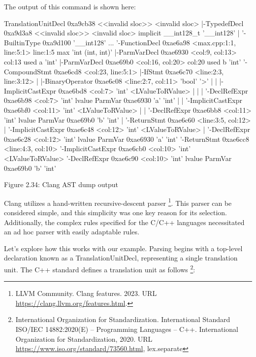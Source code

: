 The output of this command is shown here:

\begin{shell}
TranslationUnitDecl 0xa9cb38 <<invalid sloc>> <invalid sloc>
|-TypedefDecl 0xa9d3a8 <<invalid sloc>> <invalid sloc>
implicit __int128_t '__int128'
| '-BuiltinType 0xa9d100 '__int128'
...
'-FunctionDecl 0xae6a98 <max.cpp:1:1, line:5:1> line:1:5 max
'int (int, int)'
  |-ParmVarDecl 0xae6930 <col:9, col:13> col:13 used a 'int'
  |-ParmVarDecl 0xae69b0 <col:16, col:20> col:20 used b 'int'
  '-CompoundStmt 0xae6cd8 <col:23, line:5:1>
    |-IfStmt 0xae6c70 <line:2:3, line:3:12>
    | |-BinaryOperator 0xae6c08 <line:2:7, col:11> 'bool' '>'
    | | |-ImplicitCastExpr 0xae6bd8 <col:7> 'int' <LValueToRValue>
    | | | '-DeclRefExpr 0xae6b98 <col:7> 'int' lvalue ParmVar 0xae6930
            'a' 'int'
    | | '-ImplicitCastExpr 0xae6bf0 <col:11> 'int' <LValueToRValue>
    | |   '-DeclRefExpr 0xae6bb8 <col:11> 'int' lvalue ParmVar 0xae69b0
            'b' 'int'
    | '-ReturnStmt 0xae6c60 <line:3:5, col:12>
    |   '-ImplicitCastExpr 0xae6c48 <col:12> 'int' <LValueToRValue>
    |     '-DeclRefExpr 0xae6c28 <col:12> 'int' lvalue ParmVar 0xae6930
            'a' 'int'
    '-ReturnStmt 0xae6cc8 <line:4:3, col:10>
      '-ImplicitCastExpr 0xae6cb0 <col:10> 'int' <LValueToRValue>
        '-DeclRefExpr 0xae6c90 <col:10> 'int' lvalue ParmVar 0xae69b0
            'b' 'int'
\end{shell}

\begin{center}
Figure 2.34: Clang AST dump output
\end{center}

Clang utilizes a hand-written recursive-descent parser \footnote{LLVM Community. Clang features. 2023. URL \url{https://clang.llvm.org/features.html}.}. This parser can be considered simple, and this simplicity was one key reason for its selection. Additionally, the complex rules specified for the C/C++ languages necessitated an ad hoc parser with easily adaptable rules.

Let's explore how this works with our example. Parsing begins with a top-level declaration known as a TranslationUnitDecl, representing a single translation unit. The C++ standard defines a translation unit as follows \footnote{International Organization for Standardization. International Standard ISO/IEC 14882:2020(E) – Programming Languages – C++. International Organization for Standardization, 2020. URL \url{https://www.iso.org/standard/73560.html}, lex.separate}:

